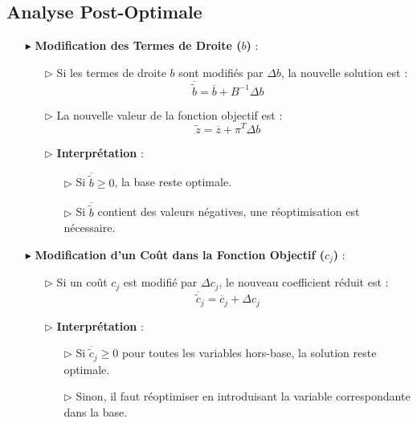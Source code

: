 \documentclass{report}
\begin{document}
\begin{multicols*}{2}
\section{Analyse Post-Optimale}

\begin{itemize}
    \item[$\blacktriangleright$] \textbf{Modification des Termes de Droite (\( b \))} :
    \begin{itemize}
        \item[$\rhd$] Si les termes de droite \( b \) sont modifiés par \( \Delta b \), la nouvelle solution est :
        \[
        \boxed{\overline{\tilde{b}} = \overline{b} + B^{-1} \Delta b}
        \]
        \item[$\rhd$] La nouvelle valeur de la fonction objectif est :
        \[
        \boxed{\tilde{z} = \overline{z} + \pi^T \Delta b}
        \]
        \item[$\rhd$] \textbf{Interprétation} :
        \begin{itemize}
            \item[$\rhd$] Si \( \overline{\tilde{b}} \geq 0 \), la base reste optimale.
            \item[$\rhd$] Si \( \overline{\tilde{b}} \) contient des valeurs négatives, une réoptimisation est nécessaire.
        \end{itemize}
    \end{itemize}

    \item[$\blacktriangleright$] \textbf{Modification d'un Coût dans la Fonction Objectif (\( c_j \))} :
    \begin{itemize}
        \item[$\rhd$] Si un coût \( c_j \) est modifié par \( \Delta c_j \), le nouveau coefficient réduit est :
        \[
        \boxed{\overline{\tilde{c}}_j = \overline{c}_j + \Delta c_j}
        \]
        \item[$\rhd$] \textbf{Interprétation} :
        \begin{itemize}
            \item[$\rhd$] Si \( \overline{\tilde{c}}_j \geq 0 \) pour toutes les variables hors-base, la solution reste optimale.
            \item[$\rhd$] Sinon, il faut réoptimiser en introduisant la variable correspondante dans la base.
        \end{itemize}
    \end{itemize}


\end{itemize}
\end{multicols*}
\end{document}
